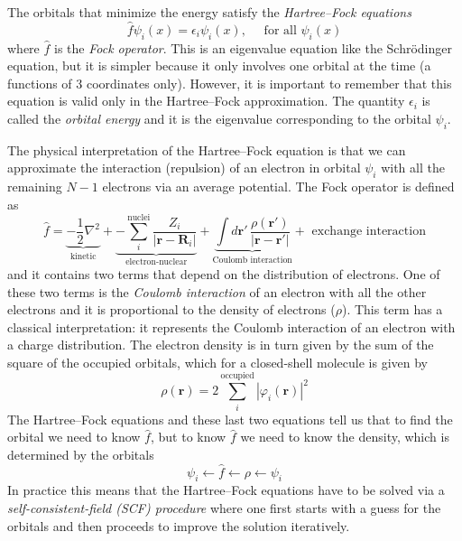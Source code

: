 \documentclass[../Main/chem371-notes.tex]{subfiles}
\begin{document}
The orbitals that minimize the energy satisfy the \emph{Hartree--Fock equations}
\begin{equation}
\hat{f} \psi_i(x) = \epsilon_i  \psi_i(x), \quad \text{ for all } \psi_i(x)
\end{equation}
where $\hat{f}$ is the \emph{Fock operator}.
This is an eigenvalue equation like the Schr\"{o}dinger equation, but it is simpler because it only involves one orbital at the time (a functions of 3 coordinates only).
However, it is important to remember that this equation is valid only in the Hartree--Fock approximation.
The quantity $\epsilon_i$ is called the \emph{orbital energy} and it is the eigenvalue corresponding to the orbital $\psi_i$.

The physical interpretation of the Hartree--Fock equation is that we can approximate the interaction (repulsion) of an electron in orbital $\psi_i$ with all the remaining $N-1$ electrons via an average potential. 
The Fock operator is defined as
\begin{equation}
\hat{f} = \underbrace{-\frac{1}{2}\nabla^2}_{\text{kinetic}}
+\underbrace{
- \sum_i^{\mathrm{nuclei}} \frac{Z_i}{|\mathbf{r} - \mathbf{R}_i|}
}_{\text{electron-nuclear}}
+
\underbrace{
\int d\mathbf{r}' \, \frac{\rho(\mathbf{r}')}{|\mathbf{r} -\mathbf{r}'|}
}_{\text{Coulomb interaction}} + \text{ exchange interaction}
\end{equation}
and it contains two terms that depend on the distribution of electrons.
One of these two terms is the \emph{Coulomb interaction} of an electron with all the other electrons and it is proportional to the density of electrons ($\rho$). This term has a classical interpretation: it represents the Coulomb interaction of an electron with a charge distribution.
The electron density is in turn given by the sum of the square of the occupied orbitals, which for a closed-shell molecule is given by
\begin{equation}
\rho(\mathbf{r}) = 2 \sum_{i}^\mathrm{occupied} |\varphi_i(\mathbf{r})|^2
\end{equation}
The Hartree--Fock equations and these last two equations tell us that to find the orbital we need to know $\hat{f}$, but to know $\hat{f}$ we need to know the density, which is determined by the orbitals
\begin{equation}
\psi_i \leftarrow \hat{f} \leftarrow \rho \leftarrow \psi_i
\end{equation}
In practice this means that the Hartree--Fock equations have to be solved via a \emph{self-consistent-field (SCF) procedure} where one first starts with a guess for the orbitals and then proceeds to improve the solution iteratively.
\end{document}
